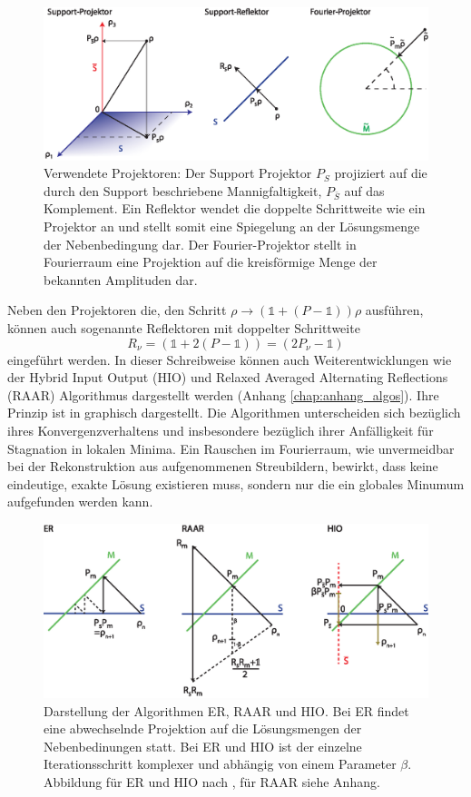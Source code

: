 	\begin{figure}
		\centering
		\includegraphics[width=1\textwidth]{images/projektor.eps}
		\caption[Projektoren]{Verwendete Projektoren: Der Support Projektor $P_S$ projiziert auf die durch den Support beschriebene Mannigfaltigkeit, $P_{\bar{S}}$ auf das Komplement. Ein Reflektor wendet die doppelte Schrittweite wie ein Projektor an und stellt somit eine Spiegelung an der Lösungsmenge der Nebenbedingung dar. Der Fourier-Projektor stellt in Fourierraum eine Projektion auf die kreisförmige Menge der bekannten Amplituden dar.}
		\label{fig:projektoren}
	\end{figure}
	Neben den Projektoren die, den Schritt $\rho\rightarrow (\mathbb{1}+(P-\mathbb{1}))\rho$ ausführen, können auch sogenannte Reflektoren mit doppelter Schrittweite
	\begin{equation}
	R_\nu= (\mathbb{1}+2(P-\mathbb{1}))=(2P_\nu-\mathbb{1})
	\end{equation}
	eingeführt werden.
In dieser Schreibweise können auch Weiterentwicklungen wie der Hybrid Input Output (HIO) und Relaxed Averaged Alternating Reflections (RAAR) Algorithmus dargestellt werden (Anhang \ref{chap:anhang_algos}). Ihre Prinzip ist in  graphisch dargestellt. Die Algorithmen unterscheiden sich bezüglich ihres Konvergenzverhaltens und insbesondere bezüglich ihrer Anfälligkeit für Stagnation in lokalen Minima. 
Ein Rauschen im Fourierraum, wie unvermeidbar bei der Rekonstruktion aus aufgenommenen Streubildern, bewirkt, dass keine eindeutige, exakte Lösung existieren muss, sondern nur die ein globales Minumum aufgefunden werden kann. 
	\begin{figure}
		\centering
		\includegraphics[width=1\textwidth]{images/algorithmen.eps}
		\caption[Rekonstruktionsalgorithmen]{Darstellung der Algorithmen ER, RAAR und HIO. Bei ER findet eine abwechselnde Projektion auf die Lösungsmengen der Nebenbedinungen statt. Bei ER und HIO ist der einzelne Iterationsschritt komplexer und abhängig von einem Parameter $\beta$. Abbildung für ER und HIO nach \cite{marchesini2007}, für RAAR siehe Anhang.}
		\label{fig:recon}
	\end{figure} 
